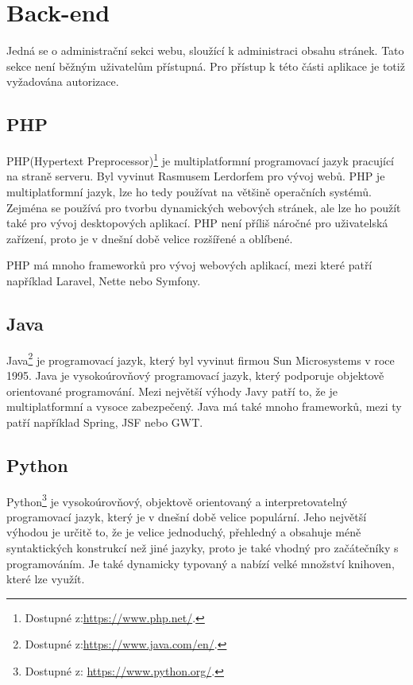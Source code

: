 \section{Back-end}

Jedná se o administrační sekci webu, sloužící k administraci obsahu stránek. Tato sekce není běžným uživatelům přístupná. Pro přístup k této části aplikace je totiž vyžadována autorizace. \cite{backend}


\subsection{PHP}

PHP(Hypertext Preprocessor)\footnote{Dostupné z:\url{https://www.php.net/}.} je multiplatformní programovací jazyk pracující na straně serveru. Byl vyvinut Rasmusem Lerdorfem pro vývoj webů. PHP je multiplatformní jazyk, lze ho tedy používat na většině operačních systémů. Zejména se používá pro tvorbu dynamických webových stránek, ale lze ho použít také pro vývoj desktopových aplikací. PHP není příliš náročné pro uživatelská zařízení, proto je v dnešní době velice rozšířené a oblíbené. \cite{php}

PHP má mnoho frameworků pro vývoj webových aplikací, mezi které patří například Laravel, Nette nebo Symfony.

\subsection{Java}

Java\footnote{Dostupné z:\url{https://www.java.com/en/}.} je programovací jazyk, který byl vyvinut firmou Sun Microsystems v roce 1995. Java je vysokoúrovňový programovací jazyk, který podporuje objektově orientované programování. Mezi největší výhody Javy patří to, že je multiplatformní a vysoce zabezpečený. \cite{java}
Java má také mnoho frameworků, mezi ty patří například Spring, JSF nebo GWT.

\subsection{Python}


Python\footnote{Dostupné z: \url{https://www.python.org/}.} je vysokoúrovňový, objektově orientovaný a interpretovatelný programovací jazyk, který je v dnešní době velice populární. Jeho největší výhodou je určitě to, že je velice jednoduchý, přehledný a obsahuje méně syntaktických konstrukcí než jiné jazyky, proto je také vhodný pro začátečníky s programováním. Je také dynamicky typovaný a nabízí velké množství knihoven, které lze využít. \cite{python}

